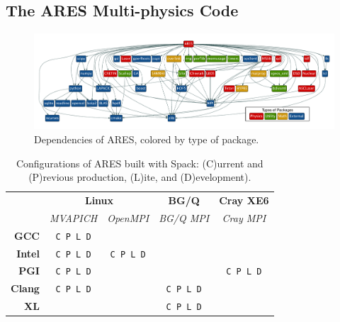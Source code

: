 
\subsection{The ARES Multi-physics Code}
\label{sec:ares}

\begin{figure}
	\includegraphics[width=\textwidth]{figs/ares-dot/ares-fig.pdf}
	\caption{
		Dependencies of ARES, colored by type of package.
		\label{fig:ares}
	}
\end{figure}

\begin{table}\centering
\begin{tabular}{|r|c|c|c|c|}
\hline
\multirow{2}{*}{} & \multicolumn{2}{|c|}{\bf Linux} & {\bf BG/Q}     & {\bf Cray XE6} \\\cline{2-5}
                  & {\it MVAPICH} & {\it OpenMPI}   & {\it BG/Q MPI} & {\it Cray MPI} \\\hline
{\bf GCC}         & {\tt C P L D} &                 &                &                \\\hline
{\bf Intel}       & {\tt C P L D} & {\tt C P L D}   &                &                \\\hline
{\bf PGI}         & {\tt C P L D} &                 &                & {\tt C P L D}  \\\hline
{\bf Clang}       & {\tt C P L D} &                 & {\tt C P L D}  &                \\\hline
{\bf XL}          &               &                 & {\tt C P L D}  &                \\\hline
\end{tabular}
\caption{
	Configurations of ARES built with Spack: \newline
	(C)urrent and 
	(P)revious production, (L)ite, and (D)evelopment).
	\label{tab:ares-configs}
}
\end{table}

